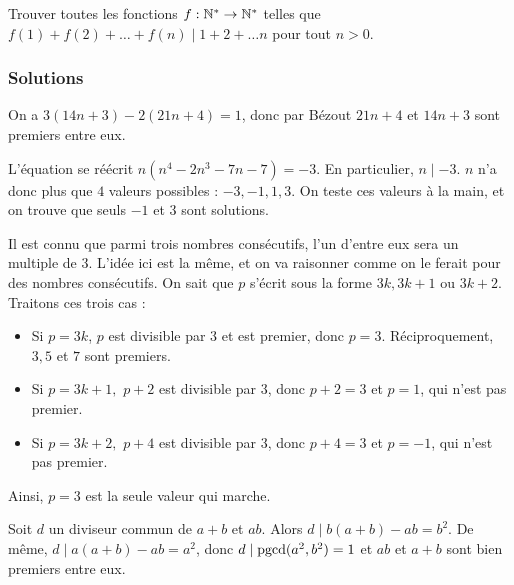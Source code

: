 \begin{exo}
Trouver toutes les fonctions $f : \mathbb N^*\rightarrow\mathbb N^*$ telles que $f(1)+f(2)+\dots+f(n)\mid 1+2+\dots n$ pour tout $n>0$.
\end{exo}


\subsubsection{Solutions}


\begin{sol}
On a $3(14n+3)-2(21n+4)=1$, donc par Bézout $21n+4$ et $14n+3$ sont premiers entre eux.
\end{sol}


\begin{sol}
L'équation se réécrit $n(n^4-2n^3-7n-7)=-3$. En particulier, $n\mid -3$. $n$ n'a donc plus que $4$ valeurs possibles : $-3,-1,1,3.$ On teste ces valeurs à la main, et on trouve que seuls $-1$ et $3$ sont solutions.
\end{sol}


\begin{sol}
Il est connu que parmi trois nombres consécutifs, l'un d'entre eux sera un multiple de $3$. L'idée ici est la même, et on va raisonner comme on le ferait pour des nombres consécutifs. On sait que $p$ s'écrit sous la forme $3k, 3k+1$ ou $3k+2$. Traitons ces trois cas :\\
\begin{itemize}
\item Si $p=3k$, $p$ est divisible par $3$ et est premier, donc $p=3$. Réciproquement, $3,5$ et $7$ sont premiers.
\item Si $p=3k+1, $ $p+2$ est divisible par $3$, donc $p+2=3$ et $p=1$, qui n'est pas premier.
\item Si $p=3k+2, $ $p+4$ est divisible par $3$, donc $p+4=3$ et $p=-1$, qui n'est pas premier.
\end{itemize}
Ainsi, $p=3$ est la seule valeur qui marche.
\end{sol}


\begin{sol}
Soit $d$ un diviseur commun de $a+b$ et $ab$. Alors $d\mid b(a+b)-ab=b^2$. De même, $d\mid a(a+b)-ab=a^2$, donc $d\mid \operatorname{\mathrm{pgcd}}(a^2,b^2)=1$ et $ab$ et $a+b$ sont bien premiers entre eux.
\end{sol}


